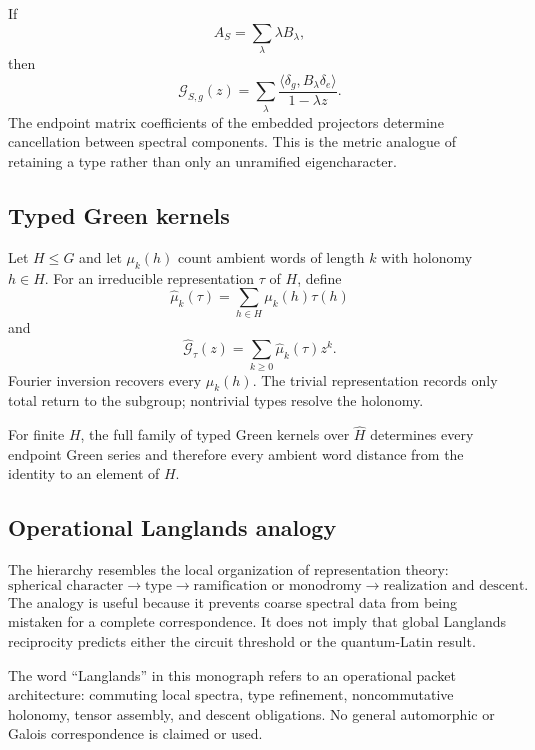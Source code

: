 If
\[
A_S=\sum_\lambda \lambda B_\lambda,
\]
then
\[
\mathcal G_{S,g}(z)
=
\sum_\lambda
\frac{\langle\delta_g,B_\lambda\delta_e\rangle}{1-\lambda z}.
\]
The endpoint matrix coefficients of the embedded projectors determine cancellation between spectral components.  This is the metric analogue of retaining a type rather than only an unramified eigencharacter.

\subsection{Typed Green kernels}
Let $H\le G$ and let $\mu_k(h)$ count ambient words of length $k$ with holonomy $h\in H$.  For an irreducible representation $\tau$ of $H$, define
\[
\widehat\mu_k(\tau)
=
\sum_{h\in H}\mu_k(h)\tau(h)
\]
and
\[
\widehat{\mathcal G}_\tau(z)
=
\sum_{k\ge0}\widehat\mu_k(\tau)z^k.
\]
Fourier inversion recovers every $\mu_k(h)$.  The trivial representation records only total return to the subgroup; nontrivial types resolve the holonomy.

\begin{provedbox}
For finite $H$, the full family of typed Green kernels over $\widehat H$ determines every endpoint Green series and therefore every ambient word distance from the identity to an element of $H$.
\end{provedbox}

\subsection{Operational Langlands analogy}
The hierarchy resembles the local organization of representation theory:
\[
\text{spherical character}
\to
\text{type}
\to
\text{ramification or monodromy}
\to
\text{realization and descent}.
\]
The analogy is useful because it prevents coarse spectral data from being mistaken for a complete correspondence.  It does not imply that global Langlands reciprocity predicts either the circuit threshold or the quantum-Latin result.

\begin{boundarybox}
The word ``Langlands'' in this monograph refers to an operational packet architecture: commuting local spectra, type refinement, noncommutative holonomy, tensor assembly, and descent obligations.  No general automorphic or Galois correspondence is claimed or used.
\end{boundarybox}

